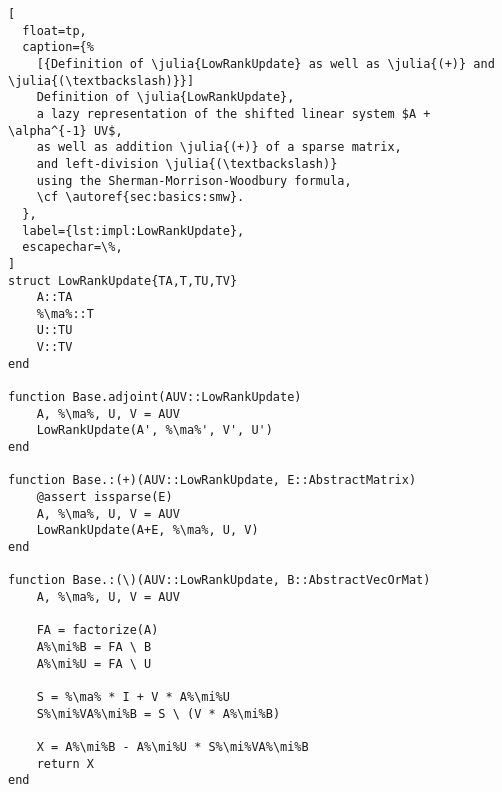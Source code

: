 \def\mi{\textsuperscript{-1}}
\def\ma{\protect\makebox[\widthof{a}]{$\alpha$}}
\begin{lstlisting}[
  float=tp,
  caption={%
    [{Definition of \julia{LowRankUpdate} as well as \julia{(+)} and \julia{(\textbackslash)}}]
    Definition of \julia{LowRankUpdate},
    a lazy representation of the shifted linear system $A + \alpha^{-1} UV$,
    as well as addition \julia{(+)} of a sparse matrix,
    and left-division \julia{(\textbackslash)}
    using the Sherman-Morrison-Woodbury formula,
    \cf \autoref{sec:basics:smw}.
  },
  label={lst:impl:LowRankUpdate},
  escapechar=\%,
]
struct LowRankUpdate{TA,T,TU,TV}
    A::TA
    %\ma%::T
    U::TU
    V::TV
end

function Base.adjoint(AUV::LowRankUpdate)
    A, %\ma%, U, V = AUV
    LowRankUpdate(A', %\ma%', V', U')
end

function Base.:(+)(AUV::LowRankUpdate, E::AbstractMatrix)
    @assert issparse(E)
    A, %\ma%, U, V = AUV
    LowRankUpdate(A+E, %\ma%, U, V)
end

function Base.:(\)(AUV::LowRankUpdate, B::AbstractVecOrMat)
    A, %\ma%, U, V = AUV

    FA = factorize(A)
    A%\mi%B = FA \ B
    A%\mi%U = FA \ U

    S = %\ma% * I + V * A%\mi%U
    S%\mi%VA%\mi%B = S \ (V * A%\mi%B)

    X = A%\mi%B - A%\mi%U * S%\mi%VA%\mi%B
    return X
end
\end{lstlisting}


